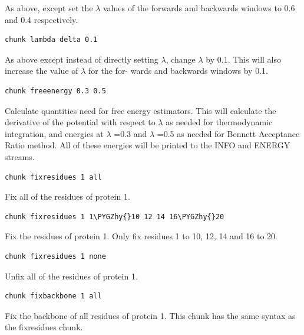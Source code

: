 \documentclass[letterpaper,10pt,english]{sphinxmanual}
\def\PYGZhy{\char`\-}
\begin{document}
As above, except set the \(\lambda\) values of the forwards and backwards windows to 0.6 and 0.4 respectively.

\begin{Verbatim}[commandchars=\\\{\}]
chunk lambda delta 0.1
\end{Verbatim}

As above except instead of directly setting \(\lambda\), change \(\lambda\) by 0.1. This will also increase the value of \(\lambda\) for the for- wards and backwards windows by 0.1.

\begin{Verbatim}[commandchars=\\\{\}]
chunk freeenergy 0.3 0.5
\end{Verbatim}

Calculate quantities need for free energy estimators. This will calculate the derivative of the potential with respect to \(\lambda\) as needed for thermodynamic integration, and energies at \(\lambda\) =0.3 and \(\lambda\) =0.5 as needed for Bennett Acceptance Ratio method. All of these energies will be printed to the INFO and ENERGY streams.

\begin{Verbatim}[commandchars=\\\{\}]
chunk fixresidues 1 all
\end{Verbatim}

Fix all of the residues of protein 1.

\begin{Verbatim}[commandchars=\\\{\}]
chunk fixresidues 1 1\PYGZhy{}10 12 14 16\PYGZhy{}20
\end{Verbatim}

Fix the residues of protein 1. Only fix residues 1 to 10, 12, 14 and 16 to 20.

\begin{Verbatim}[commandchars=\\\{\}]
chunk fixresidues 1 none
\end{Verbatim}

Unfix all of the residues of protein 1.

\begin{Verbatim}[commandchars=\\\{\}]
chunk fixbackbone 1 all
\end{Verbatim}

Fix the backbone of all residues of protein 1. This chunk has the same syntax as the fixresidues chunk.
\end{document}

